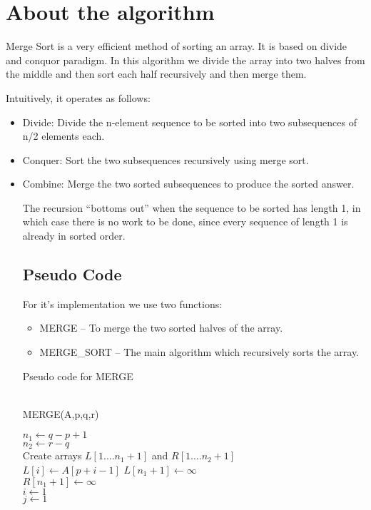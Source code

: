 \documentclass{article}
\author{Anmol Porwal }
\date{Feburary 2017 }
\begin{document}
\maketitle
\section{About the algorithm}
Merge Sort is a very efficient method of sorting an array. It is based on divide and conquor paradigm. In this algorithm we divide the array into two halves from the middle and then sort each half recursively and then merge them.

Intuitively, it operates as follows:
\begin{itemize}

	\item Divide: Divide the n-element sequence to be sorted into two subsequences of n/2 elements each.
	\item Conquer: Sort the two subsequences recursively using merge sort.
	\item Combine: Merge the two sorted subsequences to produce the sorted answer.

		The recursion “bottoms out” when the sequence to be sorted has length 1, in which case there is no work to be done, since every sequence of length 1 is already in sorted order.
\subsection{Pseudo Code}

		For it's implementation we use two functions:
		\begin{itemize}
			\item MERGE -- To merge the two sorted halves of the array.
			\item MERGE\_SORT -- The main algorithm which recursively sorts the array. 
		\end{itemize}	

		Pseudo code for MERGE\\\\ 
		\begin{algorithm}[H]
			\caption{MERGE(A,p,q,r)}
			\SetAlgoLined 
			$n_1 \gets q-p+1$ \\ 
			$n_2 \gets r-q$ \\
			Create arrays $L[1 .... n_1 + 1] $ and $ R[1 .... n_2 + 1]$ \\
			 {
				$L[i] \gets A[p + i -1]$ 
			}
			$L[n_1 + 1] \gets \infty$ \\
			$R[n_1 + 1] \gets \infty$ \\
			$i \gets 1$ \\
			$j \gets 1$ \\
\end{algorithm}
\end{itemize}
\end{document}
